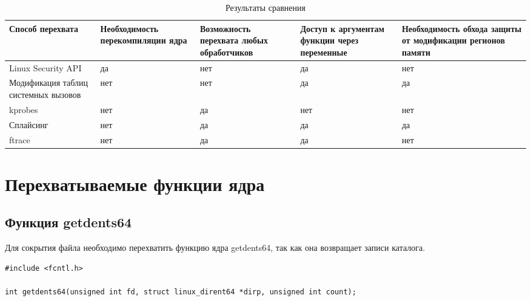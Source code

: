 \begin{table}[h]
	\begin{center}
		\begin{threeparttable}
			\captionsetup{justification=raggedright,singlelinecheck=off}
			\caption{\label{tbl:compare} Результаты сравнения}
			\begin{tabular}{|p{2.9cm}|p{3cm}|p{3cm}|p{3cm}|p{3.2cm}|}
				\hline
				Способ перехвата & Необходимость перекомпиляции ядра & Возможность перехвата любых обработчиков & Доступ к аргументам функции через переменные & Необходимость обхода защиты от модификации регионов памяти\\  \hline
				Linux Security API & да & нет & да &  нет \\ \hline 
				Модификация таблиц системных вызовов & нет & нет & да  & да \\ \hline 
				kprobes & нет & да & нет & нет  \\ \hline 
				Сплайсинг & нет & да& да &  да \\ \hline 
				ftrace & нет & да & да & нет \\ \hline 
			\end{tabular}
		\end{threeparttable}
	\end{center}
\end{table}


\section{Перехватываемые функции ядра}




\subsection{Функция getdents64}

Для сокрытия файла необходимо перехватить функцию ядра getdents64, так как она возвращает записи каталога. 
\begin{lstlisting}[label=code:getdents64,caption=Функции getdents64]
#include <fcntl.h>
	
int getdents64(unsigned int fd, struct linux_dirent64 *dirp, unsigned int count);
\end{lstlisting}


